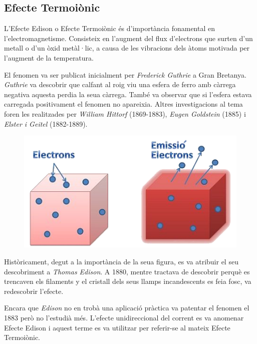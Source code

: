 \documentclass[11pt]{article}
\begin{document}
        \clearpage
    \subsection{Efecte Termoiònic}\label{appendix:termoionic}
        L'Efecte Edison o Efecte Termoiònic és d'importància fonamental en l'electromagnetisme. Consisteix en l'augment del flux d'electrons que surten d'un metall o d'un òxid metàl·lic, a causa de les vibracions dels àtoms motivada per l'augment de la temperatura.
        
        \vspace{0.4cm}El fenomen va ser publicat inicialment per \textit{Frederick Guthrie} a Gran Bretanya. \textit{Guthrie} va descobrir que calfant al roig viu una esfera de ferro amb càrrega negativa aquesta perdia la seua càrrega. També va observar que si l'esfera estava carregada positivament el fenomen no apareixia. Altres investigacions al tema foren les realitzades per \textit{William Hittorf} (1869-1883), \textit{Eugen Goldstein} (1885) i \textit{Elster i Geitel} (1882-1889).

        \begin{figure}
            \vspace{-1.1cm}
            \begin{center}
                \includegraphics[width=.245\textwidth]{fotos/termoionic.png}
            \end{center}
        \end{figure}

        \vspace{0.4cm}Històricament, degut a la importància de la seua figura, es va atribuir el seu descobriment a \textit{Thomas Edison}. A 1880, mentre tractava de descobrir perquè es trencaven els filaments y el cristall dels seus llamps incandescents es feia fosc, va redescobrir l'efecte. 
        
        \vspace{0.5cm}\hspace{0cm}Encara que \textit{Edison} no en trobà una aplicació pràctica va patentar el fenomen el 1883 però no l'estudià més. L'efecte unidireccional del corrent es va anomenar Efecte Edison i aquest terme es va utilitzar per referir-se al mateix Efecte Termoiònic. 
        
\end{document}

